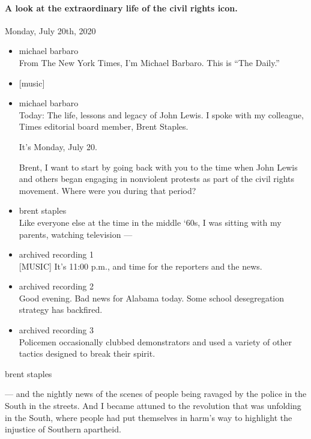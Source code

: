 \hypertarget{a-look-at-the-extraordinary-life-of-the-civil-rights-icon-2}{%
\paragraph{A look at the extraordinary life of the civil rights
icon.}\label{a-look-at-the-extraordinary-life-of-the-civil-rights-icon-2}}

Monday, July 20th, 2020

\begin{itemize}
\item
  michael barbaro\\
  From The New York Times, I'm Michael Barbaro. This is ``The Daily.''
\item
  {[}music{]}
\item
  michael barbaro\\
  Today: The life, lessons and legacy of John Lewis. I spoke with my
  colleague, Times editorial board member, Brent Staples.

  It's Monday, July 20.

  Brent, I want to start by going back with you to the time when John
  Lewis and others began engaging in nonviolent protests as part of the
  civil rights movement. Where were you during that period?
\item
  brent staples\\
  Like everyone else at the time in the middle `60s, I was sitting with
  my parents, watching television ---
\item
  archived recording 1\\
  {[}MUSIC{]} It's 11:00 p.m., and time for the reporters and the news.
\item
  archived recording 2\\
  Good evening. Bad news for Alabama today. Some school desegregation
  strategy has backfired.
\item
  archived recording 3\\
  Policemen occasionally clubbed demonstrators and used a variety of
  other tactics designed to break their spirit.
\end{itemize}

brent staples

--- and the nightly news of the scenes of people being ravaged by the
police in the South in the streets. And I became attuned to the
revolution that was unfolding in the South, where people had put
themselves in harm's way to highlight the injustice of Southern
apartheid.

